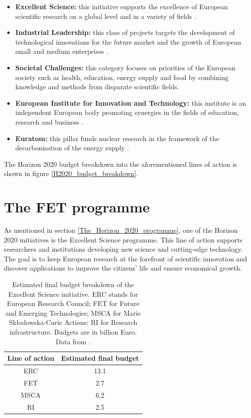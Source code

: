 \begin{itemize}
 \item \textbf{Excellent Science:} this initiative supports the excellence of European scientific research on a global level and in a variety of fields \cite{ExcellentScience}.
 \item \textbf{Industrial Leadership:} this class of projects targets the development of technological innovations for the future market and the growth of European small and medium enterprises \cite{IndustrialLeadership}.
 \item \textbf{Societal Challenges:} this category focuses on priorities of the European society such as health, education, energy supply and food by combining knowledge and methods from disparate scientific fields\cite{SocietalChallenges}.  
 \item \textbf{European Institute for Innovation and Technology:} this institute is an independent European body promoting synergies in the fields of education, research and business \cite{EIT}. 
 \item \textbf{Euratom:} this pillar funds nuclear research in the framework of the decarbonisation of the energy supply \cite{Euratom}.
\end{itemize}
The Horizon 2020 budget breakdown into the aforementioned lines of action is shown in figure \ref{H2020_budget_breakdown}.

\section{The FET programme} \label{The_FET_programme}
As mentioned in section \ref{The_Horizon_2020_programme}, one of the Horizon 2020 initiatives is the Excellent Science programme. This line of action supports researchers and institutions developing new science and cutting-edge technology. The goal is to keep European research at the forefront of scientific innovation and discover applications to improve the citizens' life and ensure economical growth.  

\begin{table}[t]
 \begin{center}
  \begin{tabular}{cc}
   \hline 
   \hline
   Line of action & Estimated final budget \\ 
   \hline
   \hline
   ERC & 13.1 \\
   FET & 2.7 \\
   MSCA & 6.2 \\
   RI & 2.5 \\
   \hline
   \hline
  \end{tabular}
 \end{center} 
 \caption{Estimated final budget breakdown of the Excellent Science initiative. ERC stands for European Research Council; FET for Future and Emerging Technologies; MSCA for Marie Sk\l{}odowska-Curie Actions; RI for Research infrastructure. Budgets are in billion Euro. Data from \cite{H2020Budget}.}
\label{FET_budget_breakdown} 
\end{table}

